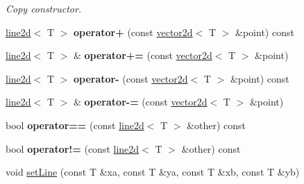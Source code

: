 \begin{DoxyCompactItemize}
\begin{DoxyCompactList}\small\item\em Copy constructor. \end{DoxyCompactList}\item 
\hyperlink{classirr_1_1core_1_1line2d}{line2d}$<$ T $>$ {\bfseries operator+} (const \hyperlink{classirr_1_1core_1_1vector2d}{vector2d}$<$ T $>$ \&point) const \hypertarget{classirr_1_1core_1_1line2d_a51af9b8fe28dd6b86ecdec1a4bb0b33b}{}\label{classirr_1_1core_1_1line2d_a51af9b8fe28dd6b86ecdec1a4bb0b33b}

\item 
\hyperlink{classirr_1_1core_1_1line2d}{line2d}$<$ T $>$ \& {\bfseries operator+=} (const \hyperlink{classirr_1_1core_1_1vector2d}{vector2d}$<$ T $>$ \&point)\hypertarget{classirr_1_1core_1_1line2d_a65cf466904a15dd61311c1381e05cf8a}{}\label{classirr_1_1core_1_1line2d_a65cf466904a15dd61311c1381e05cf8a}

\item 
\hyperlink{classirr_1_1core_1_1line2d}{line2d}$<$ T $>$ {\bfseries operator-\/} (const \hyperlink{classirr_1_1core_1_1vector2d}{vector2d}$<$ T $>$ \&point) const \hypertarget{classirr_1_1core_1_1line2d_adf2a36aae4b47529e5675386dec27e2e}{}\label{classirr_1_1core_1_1line2d_adf2a36aae4b47529e5675386dec27e2e}

\item 
\hyperlink{classirr_1_1core_1_1line2d}{line2d}$<$ T $>$ \& {\bfseries operator-\/=} (const \hyperlink{classirr_1_1core_1_1vector2d}{vector2d}$<$ T $>$ \&point)\hypertarget{classirr_1_1core_1_1line2d_a57edf657caac2f4c15ae8201fcef0e84}{}\label{classirr_1_1core_1_1line2d_a57edf657caac2f4c15ae8201fcef0e84}

\item 
bool {\bfseries operator==} (const \hyperlink{classirr_1_1core_1_1line2d}{line2d}$<$ T $>$ \&other) const \hypertarget{classirr_1_1core_1_1line2d_afe1f119e95b91aafedab58c5019bdd1c}{}\label{classirr_1_1core_1_1line2d_afe1f119e95b91aafedab58c5019bdd1c}

\item 
bool {\bfseries operator!=} (const \hyperlink{classirr_1_1core_1_1line2d}{line2d}$<$ T $>$ \&other) const \hypertarget{classirr_1_1core_1_1line2d_a6b11d575a1e248c2928ababb81638e87}{}\label{classirr_1_1core_1_1line2d_a6b11d575a1e248c2928ababb81638e87}

\item 
void \hyperlink{classirr_1_1core_1_1line2d_a65224228a0681a6be6f2576fb0093a12}{set\+Line} (const T \&xa, const T \&ya, const T \&xb, const T \&yb)\hypertarget{classirr_1_1core_1_1line2d_a65224228a0681a6be6f2576fb0093a12}{}\label{classirr_1_1core_1_1line2d_a65224228a0681a6be6f2576fb0093a12}


\end{DoxyCompactItemize}
